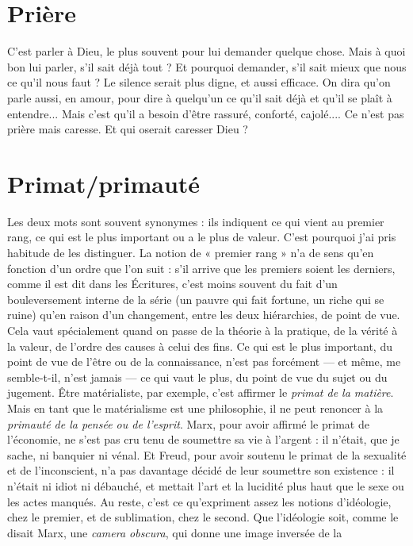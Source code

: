 \section{Prière}
C’est parler à Dieu, le plus souvent pour lui demander quelque
chose. Mais à quoi bon lui parler, s’il sait déjà tout ? Et pourquoi
demander, s’il sait mieux que nous ce qu’il nous faut ? Le silence serait plus
digne, et aussi efficace.
On dira qu’on parle aussi, en amour, pour dire à quelqu'un ce qu’il sait
déjà et qu’il se plaît à entendre... Mais c’est qu’il a besoin d’être rassuré, conforté,
cajolé.... Ce n’est pas prière mais caresse. Et qui oserait caresser Dieu ?

\section{Primat/primauté}
Les deux mots sont souvent synonymes : ils indiquent
ce qui vient au premier rang, ce qui est le plus
important ou a le plus de valeur. C’est pourquoi j'ai pris habitude de les distinguer.
La notion de « premier rang » n’a de sens qu’en fonction d’un ordre
que l’on suit : s’il arrive que les premiers soient les derniers, comme il est dit
dans les Écritures, c’est moins souvent du fait d’un bouleversement interne de
la série (un pauvre qui fait fortune, un riche qui se ruine) qu’en raison d’un
changement, entre les deux hiérarchies, de point de vue. Cela vaut spécialement
quand on passe de la théorie à la pratique, de la vérité à la valeur, de
l’ordre des causes à celui des fins. Ce qui est le plus important, du point de vue
de l’être ou de la connaissance, n’est pas forcément — et même, me semble-t-il,
n'est jamais — ce qui vaut le plus, du point de vue du sujet ou du jugement.
Être matérialiste, par exemple, c’est affirmer le {\it primat de la matière}. Mais en
tant que le matérialisme est une philosophie, il ne peut renoncer à la {\it primauté
de la pensée ou de l'esprit}. Marx, pour avoir affirmé le primat de l’économie, ne
s’est pas cru tenu de soumettre sa vie à l’argent : il n’était, que je sache, ni banquier
ni vénal. Et Freud, pour avoir soutenu le primat de la sexualité et de
l'inconscient, n’a pas davantage décidé de leur soumettre son existence : il
n'était ni idiot ni débauché, et mettait l’art et la lucidité plus haut que le sexe
ou les actes manqués. Au reste, c’est ce qu’expriment assez les notions d’idéologie,
chez le premier, et de sublimation, chez le second. Que l'idéologie soit,
comme le disait Marx, une {\it camera obscura}, qui donne une image inversée de la
